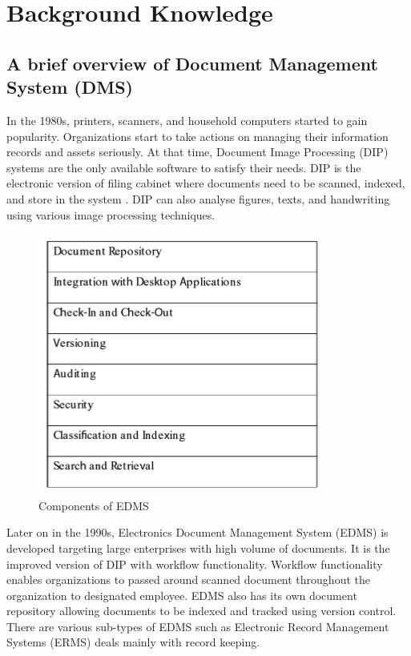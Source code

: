 \chapter{Background Knowledge}

\section{A brief overview of Document Management System (DMS)}
In the 1980s, printers, scanners, and household computers started to gain popularity.
Organizations start to take actions on managing their information records and assets seriously.
At that time, Document Image Processing (DIP) systems are the only available software to satisfy their needs.
DIP is the electronic version of filing cabinet where documents need to be scanned, indexed, and store in the system \cite{1_adam_2008}.
DIP can also analyse figures, texts, and handwriting \cite{akram2010document} using various image processing techniques.
\begin{figure}
	\centering
	\includegraphics[scale=0.7]{res/bg-knowledge/edms-components.png}
	\caption{Components of EDMS }
	\label{fig:edms-components}
\end{figure}
Later on in the 1990s, Electronics Document Management System (EDMS) is developed targeting large enterprises with high volume of documents.
It is the improved version of DIP with workflow functionality.
Workflow functionality enables organizations to passed around scanned document throughout the organization to designated employee.
EDMS also has its own document repository allowing documents to be indexed and tracked using version control.
There are various sub-types of EDMS such as Electronic Record Management Systems (ERMS) deals mainly with record keeping.

